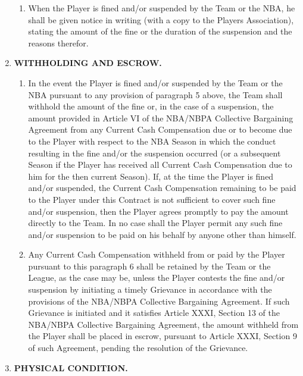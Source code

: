 \documentclass[
]{book}
\providecommand{\tightlist}{%
  \setlength{\itemsep}{0pt}\setlength{\parskip}{0pt}}
\begin{document}
\begin{enumerate}
\begin{enumerate}
  \item
    When the Player is fined and/or suspended by the Team or the NBA, he shall be given notice in writing (with a copy to the Players Association), stating the amount of the fine or the duration of the suspension and the reasons therefor.
  \end{enumerate}
\item
  \textbf{WITHHOLDING AND ESCROW.}

  \begin{enumerate}
  \def\labelenumii{(\alph{enumii})}
  \tightlist
  \item
    In the event the Player is fined and/or suspended by the Team or the NBA pursuant to any provision of paragraph 5 above, the Team shall withhold the amount of the fine or, in the case of a suspension, the amount provided in Article VI of the NBA/NBPA Collective Bargaining Agreement from any Current Cash Compensation due or to become due to the Player with respect to the NBA Season in which the conduct resulting in the fine and/or the suspension occurred (or a subsequent Season if the Player has received all Current Cash Compensation due to him for the then current Season). If, at the time the Player is fined and/or suspended, the Current Cash Compensation remaining to be paid to the Player under this Contract is not sufficient to cover such fine and/or suspension, then the Player agrees promptly to pay the amount directly to the Team. In no case shall the Player permit any such fine and/or suspension to be paid on his behalf by anyone other than himself.
  \item
    Any Current Cash Compensation withheld from or paid by the Player pursuant to this paragraph 6 shall be retained by the Team or the League, as the case may be, unless the Player contests the fine and/or suspension by initiating a timely Grievance in accordance with the provisions of the NBA/NBPA Collective Bargaining Agreement. If such Grievance is initiated and it satisfies Article XXXI, Section 13 of the NBA/NBPA Collective Bargaining Agreement, the amount withheld from the Player shall be placed in escrow, pursuant to Article XXXI, Section 9 of such Agreement, pending the resolution of the Grievance.
  \end{enumerate}
\item
  \textbf{PHYSICAL CONDITION.}


\end{enumerate}
\end{document}
